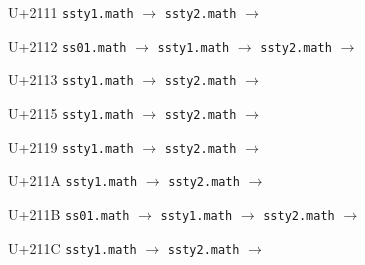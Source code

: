 \documentclass{article}
\begin{document}
\begin{substitutions}
\goodbreak

U+2111  \linebreak
    \texttt{ssty1.math} $\to$  \linebreak
    \texttt{ssty2.math} $\to$  

\goodbreak

U+2112  \linebreak
    \texttt{ss01.math} $\to$  \linebreak
    \texttt{ssty1.math} $\to$  \linebreak
    \texttt{ssty2.math} $\to$  

\goodbreak

U+2113  \linebreak
    \texttt{ssty1.math} $\to$  \linebreak
    \texttt{ssty2.math} $\to$  

\goodbreak

U+2115  \linebreak
    \texttt{ssty1.math} $\to$  \linebreak
    \texttt{ssty2.math} $\to$  

\goodbreak

U+2119  \linebreak
    \texttt{ssty1.math} $\to$  \linebreak
    \texttt{ssty2.math} $\to$  

\goodbreak

U+211A  \linebreak
    \texttt{ssty1.math} $\to$  \linebreak
    \texttt{ssty2.math} $\to$  

\goodbreak

U+211B  \linebreak
    \texttt{ss01.math} $\to$  \linebreak
    \texttt{ssty1.math} $\to$  \linebreak
    \texttt{ssty2.math} $\to$  

\goodbreak

U+211C  \linebreak
    \texttt{ssty1.math} $\to$  \linebreak
    \texttt{ssty2.math} $\to$  


\end{substitutions}
\end{document}
